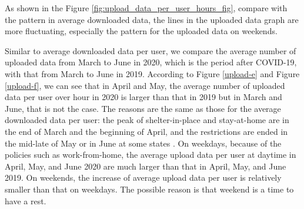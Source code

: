 As shown in the Figure \ref{fig:upload_data_per_user_hours_fig}, compare with the pattern in average downloaded data, the lines in the uploaded data graph are more fluctuating, especially the pattern for the uploaded data on weekends. 

Similar to average downloaded data per user, we compare the average number of uploaded data from March to June in 2020, which is the period after COVID-19, with that from March to June in 2019. According to Figure \ref{upload-e} and Figure \ref{upload-f}, we can see that in April and May, the average number of uploaded data per user over hour in 2020 is larger than that in 2019 but in March and June, that is not the case. The reasons are the same as those for the average downloaded data per user: the peak of shelter-in-place and stay-at-home are in the end of March and the beginning of April, and the restrictions are ended in the mid-late of May or in June at some states \cite{covid19restriction}. On weekdays, because of the policies such as work-from-home, the average upload data per user at daytime in April, May, and June 2020 are much larger than that in April, May, and June 2019. On weekends, the increase of average upload data per user is relatively smaller than that on weekdays. The possible reason is that weekend is a time to have a rest.  